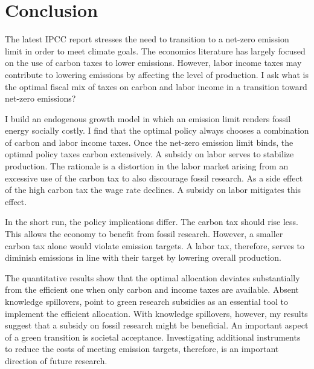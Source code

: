 \section{Conclusion}\label{sec:con}
The latest IPCC report \citep{IPCC2022} stresses the need to transition to a net-zero emission limit in order to meet climate goals. The economics literature has largely focused on the use of carbon taxes to lower emissions.  However, labor income taxes may contribute to lowering emissions by affecting the level of production. I ask what is the optimal fiscal mix of taxes on carbon and labor income in a transition toward net-zero emissions?

I build an endogenous growth model in which an emission limit renders fossil energy socially costly. I find that the optimal policy always chooses a combination of carbon and labor income taxes. Once the net-zero emission limit binds, the optimal policy taxes carbon extensively. A subsidy on labor serves to stabilize production.
The rationale is a distortion in the labor market arising from an excessive use of the carbon tax to also discourage fossil research. As a side effect of the high carbon tax the wage rate declines.  A subsidy on labor mitigates this effect.

In the short run, the policy implications differ.  
The carbon tax should rise less. This allows the economy to benefit from fossil research. However, a smaller carbon tax alone would violate emission targets. A labor tax, therefore, serves to diminish emissions in line with their target by lowering overall production.

The quantitative results show that the optimal allocation deviates substantially from the efficient one when only carbon and income taxes are available. Absent knowledge spillovers, \cite{Acemoglu2012TheChange} point to green research subsidies as an essential tool to implement the efficient allocation. With knowledge spillovers, however, my results suggest that a subsidy on fossil research might be beneficial. An important aspect of a green transition is societal acceptance. Investigating additional instruments to reduce the costs of meeting emission targets, therefore, is an important direction of future research.

\clearpage

